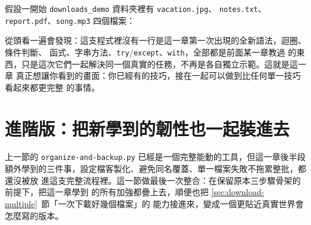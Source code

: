 假設一開始 \texttt{downloads\_demo} 資料夾裡有 \texttt{vacation.jpg}、
\texttt{notes.txt}、\texttt{report.pdf}、\texttt{song.mp3} 四個檔案：


從頭看一遍會發現：這支程式裡沒有一行是這一章第一次出現的全新語法，迴圈、條件判斷、
函式、字串方法、\texttt{try}/\texttt{except}、\texttt{with}，全部都是前面某一章教過
的東西，只是這次它們一起解決同一個真實的任務，不再是各自獨立示範。這就是這一章
真正想讓你看到的畫面：你已經有的技巧，接在一起可以做到比任何單一技巧看起來都更完整
的事情。

\section{進階版：把新學到的韌性也一起裝進去}
\label{sec:advanced-integration}

上一節的 \texttt{organize-and-backup.py} 已經是一個完整能動的工具，但這一章後半段
額外學到的三件事，設定檔客製化、避免同名覆蓋、單一檔案失敗不拖累整批，都還沒被放
進這支完整流程裡。這一節做最後一次整合：在保留原本三步驟骨架的前提下，把這一章學到
的所有加強都疊上去，順便也把 \ref{sec:download-multiple}~節「一次下載好幾個檔案」的
能力接進來，變成一個更貼近真實世界會怎麼寫的版本。

